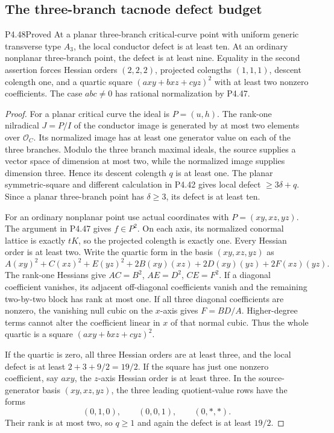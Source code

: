 \subsection{The three-branch tacnode defect budget}

\begin{statement}{P4.48}{Proved}
At a planar three-branch critical-curve point with uniform
generic transverse type $A_3$, the local conductor defect
is at least ten. At an ordinary nonplanar three-branch
point, the defect is at least nine. Equality in the
second assertion forces Hessian orders $(2,2,2)$,
projected colengths $(1,1,1)$, descent colength one,
and a quartic square $(a xy+b xz+c yz)^2$ with at
least two nonzero coefficients. The case $abc\ne0$
has rational normalization by P4.47.
\end{statement}
\begin{proof}
For a planar critical curve the ideal is $P=(u,h)$.
The rank-one nilradical $J=P/I$ of the conductor image
is generated by at most two elements over $\mathcal O_C$.
Its normalized image has at least one generator value
on each of the three branches. Modulo the three branch
maximal ideals, the source supplies a vector space of
dimension at most two, while the normalized image
supplies dimension three. Hence its descent colength
$q$ is at least one. The planar symmetric-square and
different calculation in P4.42 gives local defect
$\ge3\delta+q$. Since a planar three-branch point has
$\delta\ge3$, its defect is at least ten.

For an ordinary nonplanar point use actual coordinates
with $P=(xy,xz,yz)$. The argument in P4.47 gives
$f\in P^2$. On each axis, its normalized conormal
lattice is exactly $tK$, so the projected colength
is exactly one. Every Hessian order is at least two.
Write the quartic form in the basis $(xy,xz,yz)$ as
\[
 A(xy)^2+C(xz)^2+E(yz)^2
      +2B(xy)(xz)+2D(xy)(yz)+2F(xz)(yz).
\]
The rank-one Hessians give
$AC=B^2$, $AE=D^2$, $CE=F^2$.
If a diagonal coefficient vanishes, its adjacent
off-diagonal coefficients vanish and the remaining
two-by-two block has rank at most one. If all three
diagonal coefficients are nonzero, the vanishing null
cubic on the $x$-axis gives $F=BD/A$. Higher-degree
terms cannot alter the coefficient linear in $x$
of that normal cubic. Thus the whole quartic is a
square $(a xy+b xz+c yz)^2$.

If the quartic is zero, all three Hessian orders are
at least three, and the local defect is at least
$2+3+9/2=19/2$. If the square has just one nonzero
coefficient, say $a xy$, the $z$-axis Hessian order
is at least three. In the source-generator basis
$(xy,xz,yz)$, the three leading quotient-value rows
have the forms
\[
                      (0,1,0),\qquad(0,0,1),
                      \qquad(0,*,*).
\]
Their rank is at most two, so $q\ge1$ and again
the defect is at least $19/2$.


\end{proof}
